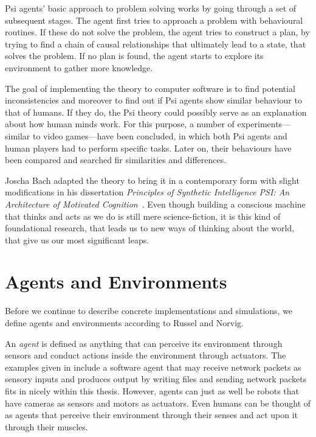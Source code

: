 Psi agents' basic approach to problem solving works by going through a set of subsequent stages. The agent first tries to approach a problem with behavioural routines. If these do not solve the problem, the agent tries to construct a plan, by trying to find a chain of causal relationships that ultimately lead to a state, that solves the problem. If no plan is found, the agent starts to explore its environment to gather more knowledge.

The goal of implementing the theory to computer software is to find potential inconsistencies and moreover to find out if Psi agents show similar behaviour to that of humans. If they do, the Psi theory could possibly serve as an explanation about how human minds work. For this purpose, a number of experiments---similar to video games---have been concluded, in which both Psi agents and human players had to perform specific tasks. Later on, their behaviours have been compared and searched fir similarities and differences.
 

Joscha Bach adapted the theory to bring it in a contemporary form with slight modifications in his dissertation \emph{Principles of Synthetic Intelligence PSI: An Architecture of Motivated Cognition}~\cite{Bach:2009:PSI:1611304}. Even though building a conscious machine that thinks and acts as we do is still mere science-fiction, it is this kind of foundational research, that leads us to new ways of thinking about the world, that give us our most significant leaps.
    
    \section{Agents and Environments}


Before we continue to describe concrete implementations and simulations, we define agents and environments according to Russel and Norvig.~\cite{russell2009artificial} 


An \emph{agent} is defined as anything that can perceive its environment through sensors and conduct actions inside the environment through actuators. The examples given in \cite{russell2009artificial} include a software agent that may receive network packets as sensory inputs and produces output by writing files and sending network packets fits in nicely within this thesis. However, agents can just as well be robots that have cameras as sensors and motors as actuators. Even humans can be thought of as agents that perceive their environment through their senses and act upon it through their muscles.

